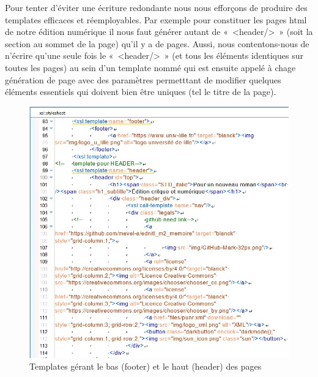 \documentclass[12pt, a4paper]{article}
\begin{document}
Pour tenter d'éviter une écriture redondante nous nous efforçons de produire des templates efficaces et réemployables. Par exemple pour constituer les pages html de notre édition numérique il nous faut générer autant de «~<header/>~» (soit la section au sommet de la page) qu'il y a de pages. Aussi, nous contentons-nous de n'écrire qu'une seule fois le «~<header/>~» (et tous les éléments identiques sur toutes les pages) au sein d'un template nommé qui est ensuite appelé à chage génération de page avec des paramètres permetttant de modifier quelques éléments essentiels qui doivent bien être uniques (tel le titre de la page).
\begin{figure}[H]
    \centering
    \includegraphics[scale=0.4]{img/screen_header.jpg}
    \caption{Templates gérant le bas (footer) et le haut (header) des pages}
    \label{fig:enter-label}
\end{figure}
\end{document}
